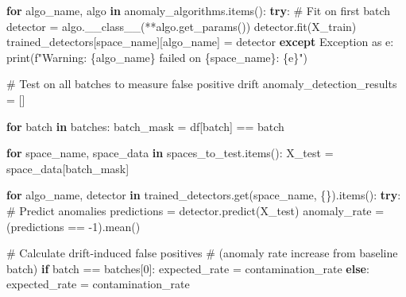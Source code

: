 \documentclass[
  letterpaper,
  DIV=11,
  numbers=noendperiod]{scrartcl}
\newenvironment{Shaded}{\begin{snugshade}}{\end{snugshade}}
\newcommand{\BuiltInTok}[1]{\textcolor[rgb]{0.00,0.23,0.31}{#1}}
\newcommand{\CommentTok}[1]{\textcolor[rgb]{0.37,0.37,0.37}{#1}}
\newcommand{\ControlFlowTok}[1]{\textcolor[rgb]{0.00,0.23,0.31}{\textbf{#1}}}
\newcommand{\DecValTok}[1]{\textcolor[rgb]{0.68,0.00,0.00}{#1}}
\newcommand{\ImportTok}[1]{\textcolor[rgb]{0.00,0.46,0.62}{#1}}
\newcommand{\KeywordTok}[1]{\textcolor[rgb]{0.00,0.23,0.31}{\textbf{#1}}}
\newcommand{\NormalTok}[1]{\textcolor[rgb]{0.00,0.23,0.31}{#1}}
\newcommand{\OperatorTok}[1]{\textcolor[rgb]{0.37,0.37,0.37}{#1}}
\newcommand{\PreprocessorTok}[1]{\textcolor[rgb]{0.68,0.00,0.00}{#1}}
\newcommand{\SpecialCharTok}[1]{\textcolor[rgb]{0.37,0.37,0.37}{#1}}
\newcommand{\SpecialStringTok}[1]{\textcolor[rgb]{0.13,0.47,0.30}{#1}}
\newcommand{\StringTok}[1]{\textcolor[rgb]{0.13,0.47,0.30}{#1}}
\newcommand{\VariableTok}[1]{\textcolor[rgb]{0.07,0.07,0.07}{#1}}
\renewenvironment{Shaded}{%
  \begin{tcolorbox}[%
    enhanced,%
    colback=codebg,%
    colframe=codebg,%
    borderline west={3pt}{0pt}{sectionblue},%
    fontupper=\small\ttfamily,%
    boxrule=0pt,%
    arc=0pt,%
    boxsep=5pt,%
    left=2mm,%
    right=2mm,%
    top=2mm,%
    bottom=2mm%
  ]%
}{%
  \end{tcolorbox}%
}
\begin{document}
\begin{Shaded}
\begin{Highlighting}[]
    \ControlFlowTok{for}\NormalTok{ algo\_name, algo }\KeywordTok{in}\NormalTok{ anomaly\_algorithms.items():}
        \ControlFlowTok{try}\NormalTok{:}
            \CommentTok{\# Fit on first batch}
\NormalTok{            detector }\OperatorTok{=}\NormalTok{ algo.}\VariableTok{\_\_class\_\_}\NormalTok{(}\OperatorTok{**}\NormalTok{algo.get\_params())}
\NormalTok{            detector.fit(X\_train)}
\NormalTok{            trained\_detectors[space\_name][algo\_name] }\OperatorTok{=}\NormalTok{ detector}
        \ControlFlowTok{except} \PreprocessorTok{Exception} \ImportTok{as}\NormalTok{ e:}
            \BuiltInTok{print}\NormalTok{(}\SpecialStringTok{f"Warning: }\SpecialCharTok{\{}\NormalTok{algo\_name}\SpecialCharTok{\}}\SpecialStringTok{ failed on }\SpecialCharTok{\{}\NormalTok{space\_name}\SpecialCharTok{\}}\SpecialStringTok{: }\SpecialCharTok{\{}\NormalTok{e}\SpecialCharTok{\}}\SpecialStringTok{"}\NormalTok{)}

\CommentTok{\# Test on all batches to measure false positive drift}
\NormalTok{anomaly\_detection\_results }\OperatorTok{=}\NormalTok{ []}

\ControlFlowTok{for}\NormalTok{ batch }\KeywordTok{in}\NormalTok{ batches:}
\NormalTok{    batch\_mask }\OperatorTok{=}\NormalTok{ df[}\StringTok{\textquotesingle{}batch\textquotesingle{}}\NormalTok{] }\OperatorTok{==}\NormalTok{ batch}
    
    \ControlFlowTok{for}\NormalTok{ space\_name, space\_data }\KeywordTok{in}\NormalTok{ spaces\_to\_test.items():}
\NormalTok{        X\_test }\OperatorTok{=}\NormalTok{ space\_data[batch\_mask]}
        
        \ControlFlowTok{for}\NormalTok{ algo\_name, detector }\KeywordTok{in}\NormalTok{ trained\_detectors.get(space\_name, \{\}).items():}
            \ControlFlowTok{try}\NormalTok{:}
                \CommentTok{\# Predict anomalies}
\NormalTok{                predictions }\OperatorTok{=}\NormalTok{ detector.predict(X\_test)}
\NormalTok{                anomaly\_rate }\OperatorTok{=}\NormalTok{ (predictions }\OperatorTok{==} \OperatorTok{{-}}\DecValTok{1}\NormalTok{).mean()}
                
                \CommentTok{\# Calculate drift{-}induced false positives}
                \CommentTok{\# (anomaly rate increase from baseline batch)}
                \ControlFlowTok{if}\NormalTok{ batch }\OperatorTok{==}\NormalTok{ batches[}\DecValTok{0}\NormalTok{]:}
\NormalTok{                    expected\_rate }\OperatorTok{=}\NormalTok{ contamination\_rate}
                \ControlFlowTok{else}\NormalTok{:}
\NormalTok{                    expected\_rate }\OperatorTok{=}\NormalTok{ contamination\_rate}
                

\end{Highlighting}
\end{Shaded}
\end{document}
